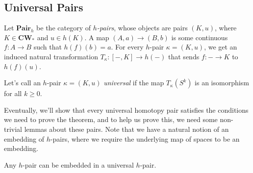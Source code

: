 \documentclass[11pt,letterpaper]{article}
\providecommand{\cw}{\mathbf{CW}_*}
\begin{document}
\subsection{Universal Pairs}

\begin{definition}
    Let $\textbf{Pair}_h$ be the category of \emph{$h$-pairs}, whose objects are pairs $(K,u)$, where $K\in \cw$ and $u\in h(K)$. A map $(A,a) \to (B,b)$ is some continuous $f : A\to B$ such that $h(f)(b) = a$. For every $h$-pair $\kappa = (K,u)$, we get an induced natural transformation $T_\kappa : [-,K] \to h(-)$ that sends $f : - \to K$ to $h(f)(u)$. 
\end{definition}

\begin{definition}
    Let's call an $h$-pair $\kappa = (K,u)$ \emph{universal} if the map $T_{\kappa}(S^k)$ is an isomorphism for all $k\geq 0$.
\end{definition}

Eventually, we'll show that every universal homotopy pair satisfies the conditions we need to prove the theorem, and to help us prove this, we need some non-trivial lemmas about these pairs. Note that we have a natural notion of an embedding of $h$-pairs, where we require the underlying map of spaces to be an embedding.

\begin{lemma}[Construction]
    Any $h$-pair can be embedded in a universal $h$-pair.
\end{lemma}
\end{document}
